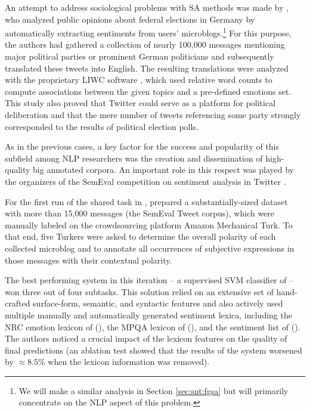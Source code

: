 An attempt to address sociological problems with SA methods was made
by \citet{Tumasjan:10}, who analyzed public opinions about federal
elections in Germany by automatically extracting sentiments from
users' microblogs.\footnote{We will make a similar analysis in Section
  \ref{sec:snt:fgsa} but will primarily concentrate on the NLP aspect
  of this problem.}  For this purpose, the authors had gathered a
collection of nearly 100,000 messages mentioning major political
parties or prominent German politicians and subsequently translated
these tweets into English.  The resulting translations were analyzed
with the proprietary LIWC software \cite{Pannebaker:07}, which used
relative word counts to compute associations between the given topics
and a pre-defined emotions set.  This study also proved that Twitter
could serve as a platform for political deliberation and that the mere
number of tweets referencing some party strongly corresponded to the
results of political election polls.

As in the previous cases, a key factor for the success and popularity
of this subfield among NLP researchers was the creation and
dissemination of high-quality big annotated corpora.  An important
role in this respect was played by the organizers of the SemEval
competition on sentiment analysis in Twitter
\cite{Nakov:13,Rosenthal:14,Rosenthal:15}.

For the first run of the shared task in \citeyear{Nakov:13},
\citet{Nakov:13} prepared a substantially-sized dataset with more than
15,000 messages (the SemEval Tweet corpus), which were manually
labeled on the crowdsourcing platform Amazon Mechanical Turk.  To that
end, five Turkers were asked to determine the overall polarity of each
collected microblog and to annotate all occurrences of subjective
expressions in those messages with their contextual polarity.

The best performing system in this iteration -- a supervised SVM
classifier of \citet{Mohammad:13} -- won three out of four subtasks.
This solution relied on an extensive set of hand-crafted surface-form,
semantic, and syntactic features and also actively used multiple
manually and automatically generated sentiment lexica, including the
NRC emotion lexicon of \citeauthor{Mohammad:13a}
(\citeyear{Mohammad:13a}), the MPQA lexicon of \citeauthor{Wilson:05}
(\citeyear{Wilson:05}), and the sentiment list of \citeauthor{Hu:04}
(\citeyear{Hu:04}).  The authors noticed a crucial impact of the
lexicon features on the quality of final predictions (an ablation test
showed that the results of the system worsened by $\approx8.5\%$ when
the lexicon information was removed).

